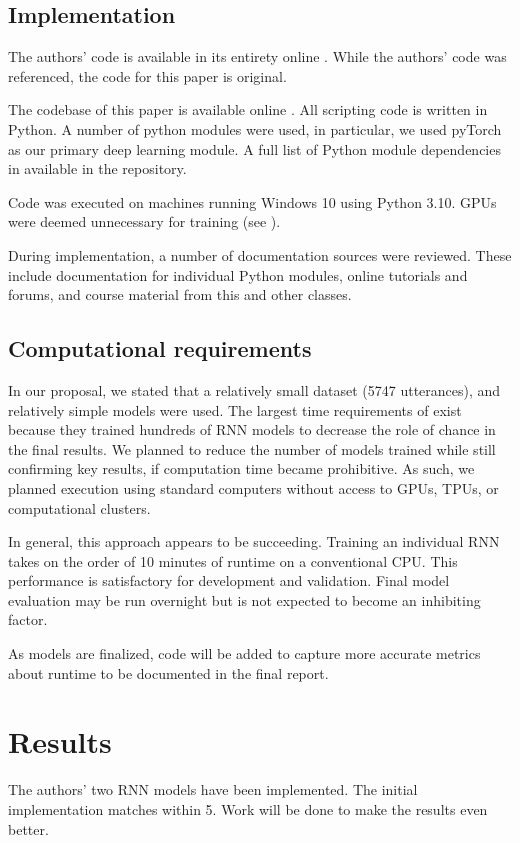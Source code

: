 \documentclass[11pt,a4paper]{article}
\begin{document}
\subsection{Implementation}
The authors' code is available in its entirety online \citep{burger_2021_data}. While the authors' code was referenced, the code for this paper is original. 

The codebase of this paper is available online \citep{cs598_repo}. All scripting code is written in Python. A number of python modules were used, in particular, we used pyTorch as our primary deep learning module. A full list of Python module dependencies in available in the repository. 

Code was executed on machines running Windows 10 using Python 3.10. GPUs were deemed unnecessary for training (see ). 

During implementation, a number of documentation sources were reviewed. These include documentation for individual Python modules, online tutorials and forums, and course material from this and other classes.  

\subsection{Computational requirements}
\label{comp_reqs}

In our proposal, we stated that a relatively small dataset (5747 utterances), and relatively simple models were used. 
The largest time requirements of \citet{burger_2021} exist because they trained hundreds of RNN models to decrease the role of chance in the final results. We planned to reduce the number of models trained while still confirming key results, if computation time became prohibitive. As such, we planned execution using standard computers without access to GPUs, TPUs, or computational clusters. 

In general, this approach appears to be succeeding. Training an individual RNN takes on the order of 10 minutes of runtime on a conventional CPU. This performance is satisfactory for development and validation. Final model evaluation may be run overnight but is not expected to become an inhibiting factor. 

As models are finalized, code will be added to capture more accurate metrics about runtime to be documented in the final report. 

\section{Results}
The authors' two RNN models have been implemented. The initial implementation matches within 5. Work will be done to make the results even better. 
\end{document}
